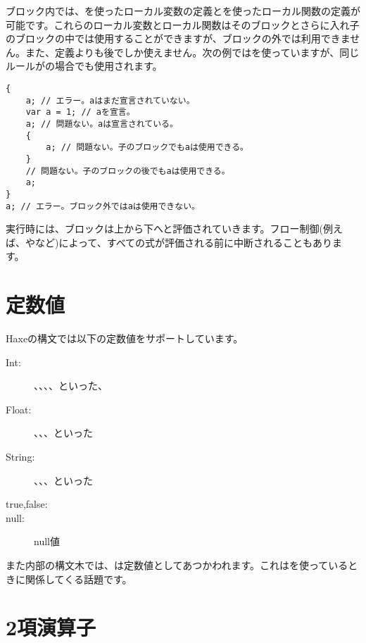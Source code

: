 ブロック内では、を使ったローカル変数の定義とを使ったローカル関数の定義が可能です。これらのローカル変数とローカル関数はそのブロックとさらに入れ子のブロックの中では使用することができますが、ブロックの外では利用できません。また、定義よりも後でしか使えません。次の例ではを使っていますが、同じルールがの場合でも使用されます。

\begin{lstlisting}
{
	a; // エラー。aはまだ宣言されていない。
	var a = 1; // aを宣言。
	a; // 問題ない。aは宣言されている。
	{
		a; // 問題ない。子のブロックでもaは使用できる。
	}
	// 問題ない。子のブロックの後でもaは使用できる。
	a;
}
a; // エラー。ブロック外ではaは使用できない。
\end{lstlisting}

実行時には、ブロックは上から下へと評価されていきます。フロー制御(例えば、やなど)によって、すべての式が評価される前に中断されることもあります。

\section{定数値}
\label{expression-constants}

Haxeの構文では以下の定数値をサポートしています。

\begin{description}
	\item[Int:] 、、、、といった、
	\item[Float:] 、、、といった
	\item[String:] 、、、といった
	\item[true,false:] 
	\item[null:] null値
\end{description}

また内部の構文木では、は定数値としてあつかわれます。これはを使っているときに関係してくる話題です。

\section{2項演算子}
\label{expression-binops}

